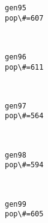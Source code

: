 \documentclass[11pt]{article}
\begin{document}
    \begin{Verbatim}[commandchars=\\\{\}]
gen95
pop\#=607

    \end{Verbatim}

    \begin{center}
    \end{center}
    { \hspace*{\fill} \\}
    
    \begin{Verbatim}[commandchars=\\\{\}]
gen96
pop\#=611

    \end{Verbatim}

    \begin{center}
    \end{center}
    { \hspace*{\fill} \\}
    
    \begin{Verbatim}[commandchars=\\\{\}]
gen97
pop\#=564

    \end{Verbatim}

    \begin{center}
    \end{center}
    { \hspace*{\fill} \\}
    
    \begin{Verbatim}[commandchars=\\\{\}]
gen98
pop\#=594

    \end{Verbatim}

    \begin{center}
    \end{center}
    { \hspace*{\fill} \\}
    
    \begin{Verbatim}[commandchars=\\\{\}]
gen99
pop\#=605

    \end{Verbatim}
\end{document}
